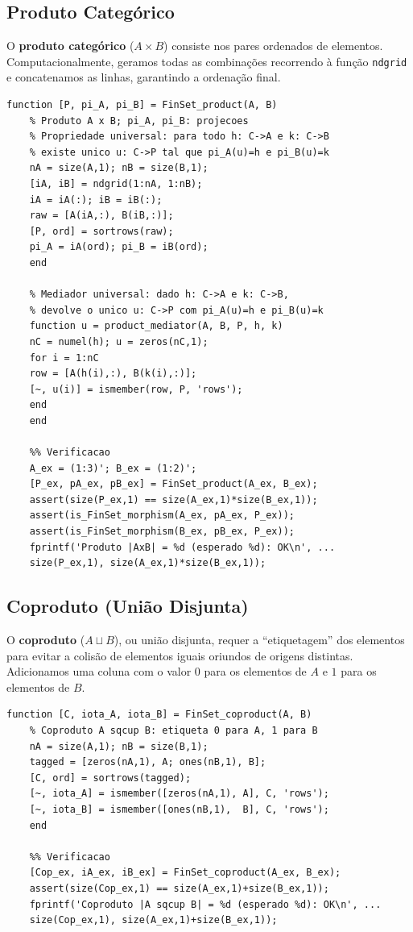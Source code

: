 \subsection{Produto Categórico}

O \textbf{produto categórico} ($A \times B$) consiste nos pares
ordenados de elementos. Computacionalmente, geramos todas as
combinações recorrendo à função \texttt{ndgrid} e concatenamos
as linhas, garantindo a ordenação final.

\begin{lstlisting}[style=matlab, caption={Produto Categórico em FinSet com propriedade universal}]
	function [P, pi_A, pi_B] = FinSet_product(A, B)
	% Produto A x B; pi_A, pi_B: projecoes
	% Propriedade universal: para todo h: C->A e k: C->B
	% existe unico u: C->P tal que pi_A(u)=h e pi_B(u)=k
	nA = size(A,1); nB = size(B,1);
	[iA, iB] = ndgrid(1:nA, 1:nB);
	iA = iA(:); iB = iB(:);
	raw = [A(iA,:), B(iB,:)];
	[P, ord] = sortrows(raw);
	pi_A = iA(ord); pi_B = iB(ord);
	end
	
	% Mediador universal: dado h: C->A e k: C->B,
	% devolve o unico u: C->P com pi_A(u)=h e pi_B(u)=k
	function u = product_mediator(A, B, P, h, k)
	nC = numel(h); u = zeros(nC,1);
	for i = 1:nC
	row = [A(h(i),:), B(k(i),:)];
	[~, u(i)] = ismember(row, P, 'rows');
	end
	end
	
	%% Verificacao
	A_ex = (1:3)'; B_ex = (1:2)';
	[P_ex, pA_ex, pB_ex] = FinSet_product(A_ex, B_ex);
	assert(size(P_ex,1) == size(A_ex,1)*size(B_ex,1));
	assert(is_FinSet_morphism(A_ex, pA_ex, P_ex));
	assert(is_FinSet_morphism(B_ex, pB_ex, P_ex));
	fprintf('Produto |AxB| = %d (esperado %d): OK\n', ...
	size(P_ex,1), size(A_ex,1)*size(B_ex,1));
\end{lstlisting}

\subsection{Coproduto (União Disjunta)}

O \textbf{coproduto} ($A \sqcup B$), ou união disjunta, requer
a ``etiquetagem'' dos elementos para evitar a colisão de elementos
iguais oriundos de origens distintas. Adicionamos uma coluna com
o valor $0$ para os elementos de $A$ e $1$ para os elementos de $B$.

\begin{lstlisting}[style=matlab, caption={Coproduto e Injeções Canónicas em FinSet}]
	function [C, iota_A, iota_B] = FinSet_coproduct(A, B)
	% Coproduto A sqcup B: etiqueta 0 para A, 1 para B
	nA = size(A,1); nB = size(B,1);
	tagged = [zeros(nA,1), A; ones(nB,1), B];
	[C, ord] = sortrows(tagged);
	[~, iota_A] = ismember([zeros(nA,1), A], C, 'rows');
	[~, iota_B] = ismember([ones(nB,1),  B], C, 'rows');
	end
	
	%% Verificacao
	[Cop_ex, iA_ex, iB_ex] = FinSet_coproduct(A_ex, B_ex);
	assert(size(Cop_ex,1) == size(A_ex,1)+size(B_ex,1));
	fprintf('Coproduto |A sqcup B| = %d (esperado %d): OK\n', ...
	size(Cop_ex,1), size(A_ex,1)+size(B_ex,1));
\end{lstlisting}

